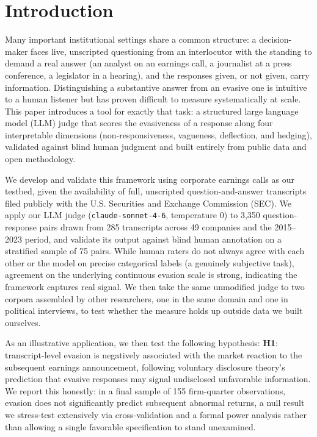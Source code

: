 \documentclass[conference]{IEEEtran}
\begin{document}
\section{Introduction}

Many important institutional settings share a common structure: a decision-maker faces live, unscripted questioning from an interlocutor with the standing to demand a real answer (an analyst on an earnings call, a journalist at a press conference, a legislator in a hearing), and the responses given, or not given, carry information. Distinguishing a substantive answer from an evasive one is intuitive to a human listener but has proven difficult to measure systematically at scale. This paper introduces a tool for exactly that task: a structured large language model (LLM) judge that scores the evasiveness of a response along four interpretable dimensions (non-responsiveness, vagueness, deflection, and hedging), validated against blind human judgment and built entirely from public data and open methodology.

We develop and validate this framework using corporate earnings calls as our testbed, given the availability of full, unscripted question-and-answer transcripts filed publicly with the U.S. Securities and Exchange Commission (SEC). We apply our LLM judge (\texttt{claude-sonnet-4-6}, temperature 0) to 3,350 question-response pairs drawn from 285 transcripts across 49 companies and the 2015--2023 period, and validate its output against blind human annotation on a stratified sample of 75 pairs. While human raters do not always agree with each other or the model on precise categorical labels (a genuinely subjective task), agreement on the underlying continuous evasion scale is strong, indicating the framework captures real signal. We then take the same unmodified judge to two corpora assembled by other researchers, one in the same domain and one in political interviews, to test whether the measure holds up outside data we built ourselves.

As an illustrative application, we then test the following hypothesis: \textbf{H1}: transcript-level evasion is negatively associated with the market reaction to the subsequent earnings announcement, following voluntary disclosure theory's prediction that evasive responses may signal undisclosed unfavorable information. We report this honestly: in a final sample of 155 firm-quarter observations, evasion does not significantly predict subsequent abnormal returns, a null result we stress-test extensively via cross-validation and a formal power analysis rather than allowing a single favorable specification to stand unexamined.
\end{document}
